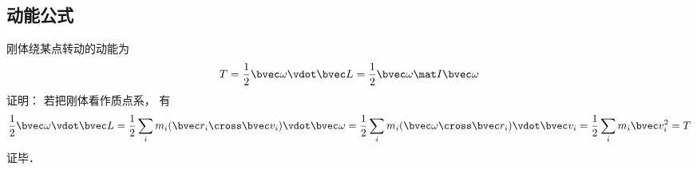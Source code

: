 \subsection{动能公式}
刚体绕某点转动的动能为
\begin{equation}
T = \frac{1}{2}\bvec \omega \vdot \bvec L = \frac{1}{2}\bvec \omega \mat I \bvec\omega
\end{equation}
证明： 若把刚体看作质点系， 有
\begin{equation}
\frac{1}{2}\bvec \omega \vdot \bvec L = \frac{1}{2} \sum_i m_i (\bvec r_i\cross \bvec v_i)\vdot \bvec \omega = \frac{1}{2} \sum_i m_i (\bvec \omega \cross \bvec r_i)\vdot \bvec v_i = \frac{1}{2} \sum_i m_i \bvec v_i^2 = T
\end{equation}
证毕．
